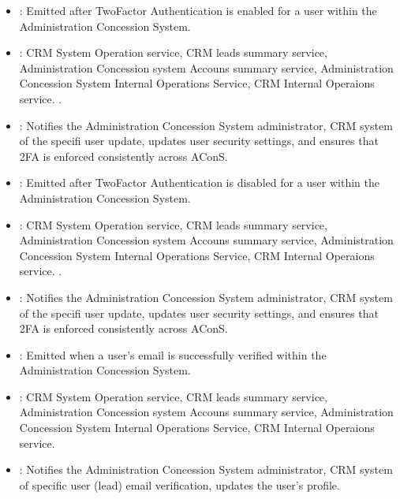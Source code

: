 \documentclass[letterpaper,10pt,english]{sphinxmanual}
\begin{document}
\sphinxAtStartPar
{}
\begin{itemize}
\item {} 
\sphinxAtStartPar
{}: Emitted after Two\sphinxhyphen{}Factor Authentication is enabled for a user within the Administration Concession System.

\item {} 
\sphinxAtStartPar
{}: CRM System Operation service, CRM leads summary service,  Administration Concession system Accouns summary service, Administration Concession System Internal Operations Service, CRM Internal Operaions service. .

\item {} 
\sphinxAtStartPar
{}: Notifies the Administration Concession System administrator, CRM system of the specifi user update, updates user security settings, and ensures that 2FA is enforced consistently across AConS.

\end{itemize}

\sphinxAtStartPar
{}
\begin{itemize}
\item {} 
\sphinxAtStartPar
{}: Emitted after Two\sphinxhyphen{}Factor Authentication is disabled for a user within the Administration Concession System.

\item {} 
\sphinxAtStartPar
{}: CRM System Operation service, CRM leads summary service,  Administration Concession system Accouns summary service, Administration Concession System Internal Operations Service, CRM Internal Operaions service. .

\item {} 
\sphinxAtStartPar
{}: Notifies the Administration Concession System administrator, CRM system of the specifi user update, updates user security settings, and ensures that 2FA is enforced consistently across AConS.

\end{itemize}

\sphinxAtStartPar
{}
\begin{itemize}
\item {} 
\sphinxAtStartPar
{}: Emitted when a user’s email is successfully verified within the Administration Concession System.

\item {} 
\sphinxAtStartPar
{}: CRM System Operation service, CRM leads summary service,  Administration Concession system Accouns summary service, Administration Concession System Internal Operations Service, CRM Internal Operaions service.

\item {} 
\sphinxAtStartPar
{}: Notifies the Administration Concession System administrator, CRM system of specific user (lead) email verification, updates the user’s profile.

\end{itemize}
\end{document}
